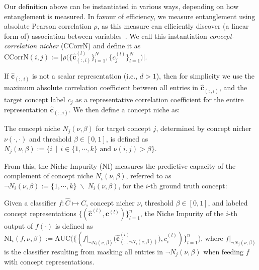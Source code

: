 Our definition above can be instantiated in various ways, depending on how entanglement is measured. In favour of efficiency, we measure entanglement using absolute Pearson correlation $\rho$, as this measure can efficiently discover (a linear form of) association between variables~\cite{altman2015points}. We call this instantiation  \emph{concept-correlation nicher} (CCorrN) and define it as
$\text{CCorrN}(i, j) := \big| \rho\big(\{\mathbf{\hat{c}}^{(l)}_{(:, i)}\}_{l=1}^N, \{c^{(l)}_j\}_{l=1}^N\big) \big|$.

If $\mathbf{\hat{c}}_{(:, i)}$ is not a scalar representation (i.e., $d > 1$), then for simplicity we use the maximum absolute correlation coefficient between all entries in $\mathbf{\hat{c}}_{(:, i)}$, and the target concept label $c_j$ as a representative correlation coefficient for the entire representation $\mathbf{\hat{c}}_{(:, i)}$. We then define a concept niche as: 
\begin{definition}
The concept niche $N_j(\nu, \beta)$ for target concept $j$, determined by concept nicher $\nu(\cdot, \cdot)$ and threshold $\beta \in [0,1]$, is defined as $N_j(\nu, \beta) := \big\{i \ \ | \ \ i \in \{1, \cdots, k\} \text{ and } \nu(i, j) > \beta \big\}$.
\end{definition}

From this, the Niche Impurity (NI) measures the predictive capacity of the complement of concept niche $N_i(\nu, \beta)$, referred to as $\neg N_i(\nu, \beta) := \{1, \cdots, k\} \; \backslash \; N_i(\nu, \beta)$, for the $i$-th ground truth concept:

\begin{definition} \label{def:niche_impurity}
Given a classifier $f: \hat{C} \mapsto C$, concept nicher $\nu$, threshold $\beta \in [0, 1]$, and labeled concept representations $\{(\mathbf{\hat{c}}^{(l)}, \mathbf{c}^{(l)})\}_{l = 1}^n$, the Niche Impurity of the $i$-th output of $f(\cdot)$ is defined as $\text{NI}_i(f, \nu, \beta) := \text{AUC} \big( \{( f|_{\neg N_i(\nu, \beta)} \big( \mathbf{\hat{c}}^{(l)}_{(:, \neg N_i(\nu, \beta))} \big), c^{(l)}_i) \}_{l=1}^n \big)$, where $f|_{\neg N_j(\nu, \beta)}$
is the classifier resulting from masking all entries in $\neg N_j(\nu, \beta)$ when feeding $f$ with concept representations. 
\end{definition}

